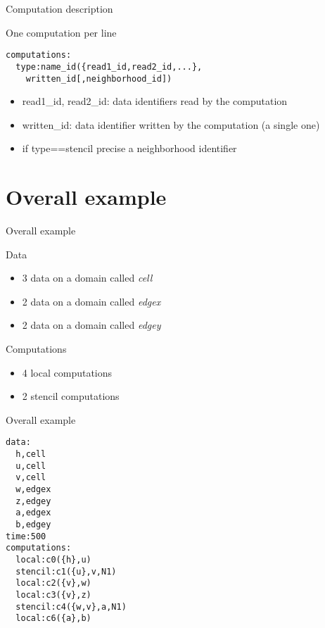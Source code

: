 \documentclass{beamer}
\begin{document}
\begin{frame}[fragile]{Computation description}
\begin{block}{One computation per line}
\begin{lstlisting}[basicstyle=\footnotesize]
computations:
  type:name_id({read1_id,read2_id,...},
    written_id[,neighborhood_id])
\end{lstlisting}
\end{block}
\begin{itemize}
\item read1\_id, read2\_id: data identifiers read by the computation
\item written\_id: data identifier written by the computation (a single one)
\item if type==stencil precise a neighborhood identifier
\end{itemize}
\end{frame}

\section{Overall example}
\begin{frame}{Overall example}
\begin{block}{Data}
\begin{itemize}
\item 3 data on a domain called \textit{cell}
\item 2 data on a domain called \textit{edgex}
\item 2 data on a domain called \textit{edgey}
\end{itemize}
\end{block}
\begin{block}{Computations}
\begin{itemize}
\item 4 local computations
\item 2 stencil computations
\end{itemize}
\end{block}
\end{frame}

\begin{frame}[fragile]{Overall example}
\begin{lstlisting}[basicstyle=\footnotesize,frame=single]
data:
  h,cell
  u,cell
  v,cell
  w,edgex
  z,edgey
  a,edgex
  b,edgey
time:500
computations:
  local:c0({h},u)
  stencil:c1({u},v,N1)
  local:c2({v},w)
  local:c3({v},z)
  stencil:c4({w,v},a,N1)
  local:c6({a},b)
\end{lstlisting}
\end{frame}
\end{document}
